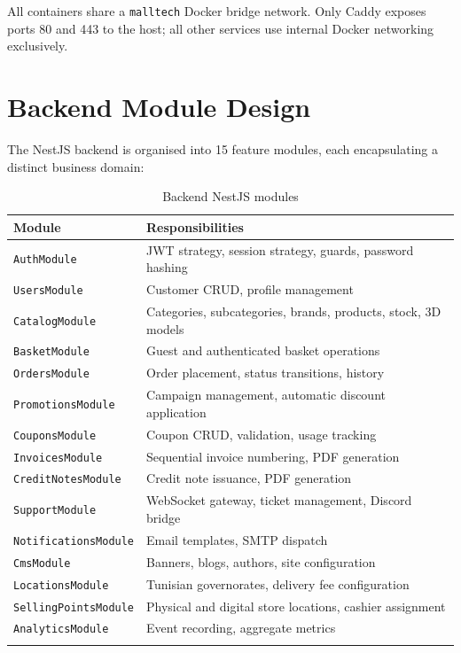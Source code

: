 All containers share a \texttt{malltech} Docker bridge network. Only Caddy
exposes ports 80 and 443 to the host; all other services use internal Docker
networking exclusively.

\section{Backend Module Design}

The NestJS backend is organised into 15 feature modules, each encapsulating a
distinct business domain:

\begin{longtable}{|m{3.5cm}|m{10cm}|}
    \hline
    \textbf{Module}              & \textbf{Responsibilities}                                     \\
    \hline
    \endhead
    \endfoot
    \endlastfoot
    \hline
    \texttt{AuthModule}          & JWT strategy, session strategy, guards, password hashing      \\
    \hline
    \texttt{UsersModule}         & Customer CRUD, profile management                             \\
    \hline
    \texttt{CatalogModule}       & Categories, subcategories, brands, products, stock, 3D models \\
    \hline
    \texttt{BasketModule}        & Guest and authenticated basket operations                     \\
    \hline
    \texttt{OrdersModule}        & Order placement, status transitions, history                  \\
    \hline
    \texttt{PromotionsModule}    & Campaign management, automatic discount application           \\
    \hline
    \texttt{CouponsModule}       & Coupon CRUD, validation, usage tracking                       \\
    \hline
    \texttt{InvoicesModule}      & Sequential invoice numbering, PDF generation                  \\
    \hline
    \texttt{CreditNotesModule}   & Credit note issuance, PDF generation                          \\
    \hline
    \texttt{SupportModule}       & WebSocket gateway, ticket management, Discord bridge          \\
    \hline
    \texttt{NotificationsModule} & Email templates, SMTP dispatch                                \\
    \hline
    \texttt{CmsModule}           & Banners, blogs, authors, site configuration                   \\
    \hline
    \texttt{LocationsModule}     & Tunisian governorates, delivery fee configuration             \\
    \hline
    \texttt{SellingPointsModule} & Physical and digital store locations, cashier assignment      \\
    \hline
    \texttt{AnalyticsModule}     & Event recording, aggregate metrics                            \\
    \hline
    \caption{Backend NestJS modules}
    \label{tab:modules}
\end{longtable}

